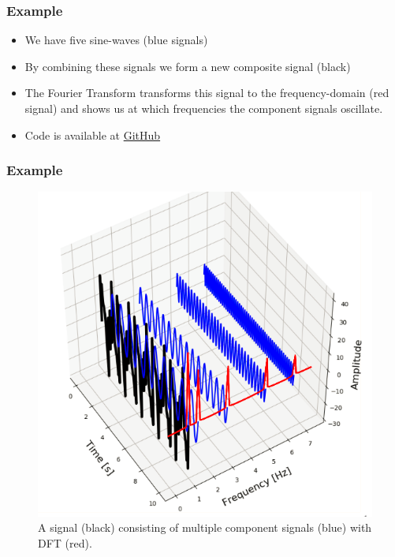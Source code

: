 \documentclass{beamer}
\newcommand{\github}{
\href{https://github.com/A-M-Kharazi/Machine-Learning-TMU}{GitHub}
}
\begin{document}
	\begin{frame}
		\frametitle{Example}
		\begin{itemize}
			\item 
			We have five sine-waves (blue signals)
			\item
			By combining these signals we form a new composite signal (black)
			\item
			 The Fourier Transform transforms this signal to the frequency-domain (red signal) and shows us at which frequencies the component signals oscillate.
			 
			 \item Code is available at \github
			
		\end{itemize}
		
	\end{frame}
	
	\begin{frame}
		\frametitle{Example}
		\begin{center}
			\begin{figure}\label{fig2}
				\includegraphics[scale=0.37]{signals3D_4.png}
				\caption{ A signal (black) consisting of multiple component signals (blue) with DFT (red).}
			\end{figure}
		\end{center}
	\end{frame}
\end{document}
